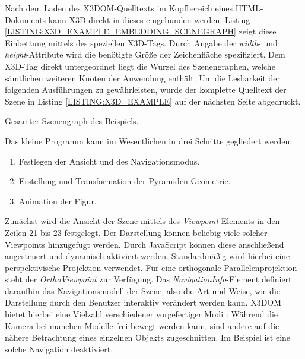 Nach dem Laden des X3DOM-Quelltexts im Kopfbereich eines HTML-Dokuments kann X3D direkt in dieses eingebunden werden. Listing \ref{LISTING:X3D_EXAMPLE_EMBEDDING_SCENEGRAPH} zeigt diese Einbettung mittels des speziellen X3D-Tags. Durch Angabe der \textit{width}- und \textit{height}-Attribute wird die benötigte Größe der Zeichenfläche spezifiziert. Dem X3D-Tag direkt untergeordnet liegt die Wurzel des Szenengraphen, welche sämtlichen weiteren Knoten der Anwendung enthält. Um die Lesbarkeit der folgenden Ausführungen zu gewährleisten, wurde der komplette Quelltext der Szene in Listing \ref{LISTING:X3D_EXAMPLE} auf der nächsten Seite abgedruckt.

\smallskip
\begin{listing}[p]
\caption{Gesamter Szenengraph des Beispiels.}
\label{LISTING:X3D_EXAMPLE}
\end{listing}

Das kleine Programm kann im Wesentlichen in drei Schritte gegliedert werden:

\smallskip
\begin{enumerate}[noitemsep]
	\item Festlegen der Ansicht und des Navigationsmodus.
	\item Erstellung und Transformation der Pyramiden-Geometrie.
	\item Animation der Figur.
\end{enumerate}

Zunächst wird die Ansicht der Szene mittels des \textit{Viewpoint}-Elements in den Zeilen 21 bis 23 festgelegt. Der Darstellung können beliebig viele solcher Viewpoints hinzugefügt werden. Durch JavaScript können diese anschließend angesteuert und dynamisch aktiviert werden.
Standardmäßig wird hierbei eine perspektivische Projektion verwendet. Für eine orthogonale Parallelenprojektion steht der \textit{OrthoViewpoint} zur Verfügung.
Das \textit{NavigationInfo}-Element definiert daraufhin das Navigationsmodell der Szene, also die Art und Weise, wie die Darstellung durch den Benutzer interaktiv verändert werden kann. X3DOM bietet hierbei eine Vielzahl verschiedener vorgefertiger Modi \autocite{X3DOM_DOCS_NAVIGATION_INFO_NODE}: Während die Kamera bei manchen Modelle frei bewegt werden kann, sind andere auf die nähere Betrachtung eines einzelnen Objekts zugeschnitten. Im Beispiel ist eine solche Navigation deaktiviert.

